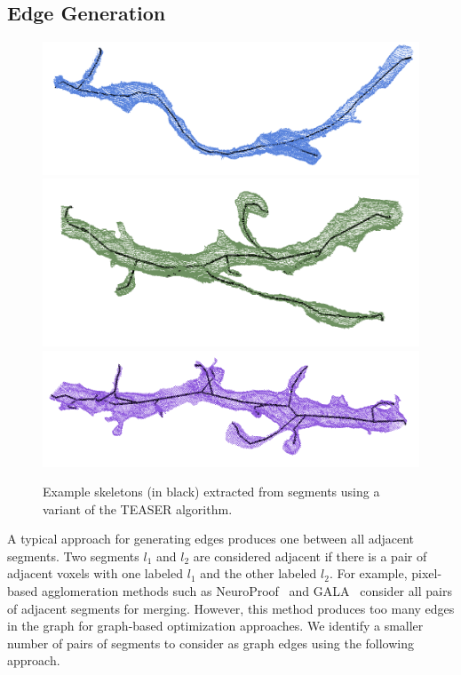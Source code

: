 \subsection{Edge Generation}

\begin{figure}[t]
	\centering
	\includegraphics[width=0.32\linewidth]{./figures/skeleton1.png}
	\includegraphics[width=0.32\linewidth]{./figures/skeleton2.png}
	\includegraphics[width=0.32\linewidth]{./figures/skeleton3.png}
	\caption{Example skeletons (in black) extracted from segments using a variant of the TEASER algorithm.}
	\label{fig:skeletonization}
\end{figure}

A typical approach for generating edges produces one between all adjacent segments. Two segments $l_1$ and $l_2$ are considered adjacent if there is a pair of adjacent voxels with one labeled $l_1$ and the other labeled $l_2$.
For example, pixel-based agglomeration methods such as NeuroProof~\cite{10.1371/journal.pone.0125825} and GALA~\cite{nunez2014graph} consider all pairs of adjacent segments for merging.
However, this method produces too many edges in the graph for graph-based optimization approaches. 
We identify a smaller number of pairs of segments to consider as graph edges using the following approach.


